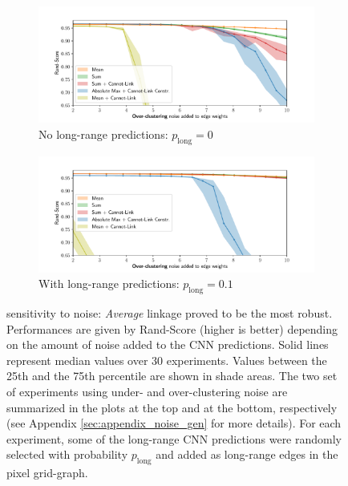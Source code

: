 \begin{figure}
        \begin{subfigure}[t]{0.49 \textwidth}
        \centering
        \includegraphics[width=\textwidth,trim=0.53in 0.1in 0.65in 0.45in,clip]{./figs/noise_plots/over_segment_plots_0.pdf}
        \caption{No long-range predictions: $p_{\mathrm{long}}=0$} \label{fig:merge_noise_only_direct}
    \end{subfigure} \hfill
    \begin{subfigure}[t]{0.49 \textwidth}
        \centering
        \includegraphics[width=\textwidth,trim=0.53in 0.1in 0.65in 0.45in,clip]{./figs/noise_plots/over_segment_plots_1.pdf}
        \caption{With long-range predictions: $p_{\mathrm{long}}=0.1$} \label{fig:merge_noise_with_long_range}
    \end{subfigure}
\caption{\algname{} sensitivity to noise: \emph{Average} linkage proved to be the most robust. Performances are given by Rand-Score (higher is better) depending on the amount of noise added to the CNN predictions.  Solid lines represent median values over 30 experiments. Values between the 25th and the 75th percentile are shown in shade areas. The two set of experiments using under- and over-clustering noise are summarized in the plots at the top and at the bottom, respectively (see Appendix \ref{sec:appendix_noise_gen} for more details). For each experiment, some of the long-range CNN predictions were randomly selected with probability $p_{\mathrm{long}}$ and added as long-range edges in the pixel grid-graph.
}\label{fig:noise_plots}
\end{figure}
